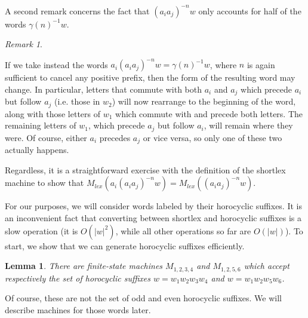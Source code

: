 \documentclass{amsart}
\newtheorem{lemma}[theorem]{Lemma}
\theoremstyle{definition}
\theoremstyle{remark}
\newtheorem{remark}[theorem]{Remark}
\begin{document}
	A second remark concerns the fact that $(a_ia_j)^{-n}w$ only accounts for half of the words $\gamma(n)^{-1}w$.
	
	\begin{remark}\label{FullConvergence}
		
		If we take instead the words $a_i (a_ia_j)^{-n}w = \gamma(n)^{-1}w$, where $n$ is again sufficient to cancel any positive prefix, then the form of the resulting word may change. In particular, letters that commute with both $a_i$ and $a_j$ which precede $a_i$ but follow $a_j$ (i.e. those in $w_2$) will now rearrange to the beginning of the word, along with those letters of $w_1$ which commute with and precede both letters. The remaining letters of $w_1$, which precede $a_j$ but follow $a_i$, will remain where they were. Of course, either $a_i$ precedes $a_j$ or vice versa, so only one of these two actually happens.
		
		Regardless, it is a straightforward exercise with the definition of the shortlex machine to show that $M_{lex}(a_i (a_ia_j)^{-n}w) = M_{lex}((a_ia_j)^{-n}w)$.
		
	\end{remark}
	
	For our purposes, we will consider words labeled by their horocyclic suffixes. It is an inconvenient fact that converting between shortlex and horocyclic suffixes is a slow operation (it is $O(|w|^2)$, while all other operations so far are $O(|w|)$). To start, we show that we can generate horocyclic suffixes efficiently.
	
	
	\begin{lemma}
		
		There are finite-state machines $M_{1,2,3,4}$ and $M_{1,2,5,6}$ which accept respectively the set of horocyclic suffixes $w=w_1w_2w_3w_4$ and $w=w_1w_2w_5w_6$.
		
	\end{lemma}
	
	Of course, these are not the set of odd and even horocyclic suffixes. We will describe machines for those words later.
	
	
	
\end{document}
